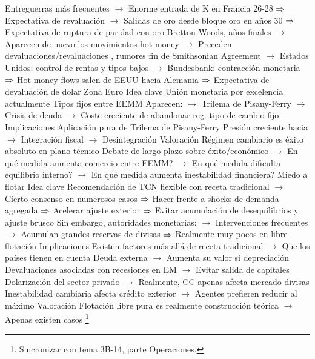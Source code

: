 \documentclass{nuevotema}
\begin{document}
\begin{esquemal}
				\4[] Entreguerras más frecuentes
				\4[] $\to$ Enorme entrada de K en Francia 26-28
				\4[] $\Rightarrow$ Expectativa de revaluación
				\4[] $\to$ Salidas de oro desde bloque oro en años 30
				\4[] $\Rightarrow$ Expectativa de ruptura de paridad con oro
				\4[] Bretton-Woods, años finales
				\4[] $\to$ Aparecen de nuevo los movimientos hot money
				\4[] $\to$ Preceden devaluaciones/revaluaciones
				, rumores fin de Smithsonian Agreement
				\4[] $\to$ Estados Unidos: control de rentas y tipos bajos
				\4[] $\to$ Bundesbank: contracción monetaria
				\4[] $\Rightarrow$ Hot money flows salen de EEUU hacia Alemania
				\4[] $\Rightarrow$ Expectativa de devaluación de dolar
			\3 Zona Euro
				\4 Idea clave
				\4[] Unión monetaria por excelencia actualmente
				\4[] Tipos fijos entre EEMM
				\4[] Aparecen:
				\4[] $\to$ Trilema de Pisany-Ferry
				\4[] $\to$ Crisis de deuda
				\4[] $\to$ Coste creciente de abandonar reg. tipo de cambio fijo
				\4 Implicaciones
				\4[] Aplicación pura de Trilema de Pisany-Ferry
				\4[] Presión creciente hacia
				\4[] $\to$ Integración fiscal
				\4[] $\to$ Desintegración
				\4 Valoración
				\4[] Régimen cambiario es éxito absoluto en plano técnico
				\4[] Debate de largo plazo sobre éxito/económico
				\4[] $\to$ En qué medida aumenta comercio entre EEMM?
				\4[] $\to$ En qué medida dificulta equilibrio interno?
				\4[] $\to$ En qué medida aumenta inestabilidad financiera?
			\3 Miedo a flotar
				\4 Idea clave
				\4[] Recomendación de TCN flexible con receta tradicional
				\4[] $\to$ Cierto consenso en numerosos casos
				\4[] $\Rightarrow$ Hacer frente a shocks de demanda agregada
				\4[] $\Rightarrow$ Acelerar ajuste exterior
				\4[] $\Rightarrow$ Evitar acumulación de desequilibrios y ajuste brusco
				\4[] Sin embargo, autoridades monetarias:
				\4[] $\to$ Intervenciones frecuentes
				\4[] $\to$ Acumulan grandes reservas de divisas
				\4[] $\Rightarrow$ Realmente muy pocos en libre flotación
				\4 Implicaciones
				\4[] Existen factores más allá de receta tradicional
				\4[] $\to$ Que los países tienen en cuenta
				\4[] Deuda externa
				\4[] $\to$ Aumenta su valor si depreciación
				\4[] Devaluaciones asociadas con recesiones en EM
				\4[] $\to$ Evitar salida de capitales
				\4[] Dolarización del sector privado
				\4[] $\to$ Realmente, CC apenas afecta mercado divisas
				\4[] Inestabilidad cambiaria afecta crédito exterior
				\4[] $\to$ Agentes prefieren reducir al máximo
				\4 Valoración
				\4[] Flotación libre pura es realmente construcción teórica
				\4[] $\to$ Apenas existen casos
	\1 \footnote{Sincronizar con tema 3B-14, parte Operaciones.}

\end{esquemal}
\end{document}
